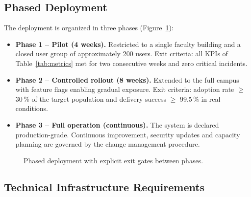 \documentclass[conference,a4paper,10pt]{IEEEtran}
\begin{document}
\subsection{Phased Deployment}

The deployment is organized in three phases (Figure~\ref{fig:phases}):

\begin{itemize}[leftmargin=*]
  \item \textbf{Phase 1 -- Pilot (4 weeks).} Restricted to a single faculty
  building and a closed user group of approximately 200 users. Exit
  criteria: all KPIs of Table~\ref{tab:metrics} met for two consecutive
  weeks and zero critical incidents.
  \item \textbf{Phase 2 -- Controlled rollout (8 weeks).} Extended to the
  full campus with feature flags enabling gradual exposure. Exit
  criteria: adoption rate $\geq$ 30\,\% of the target population and
  delivery success $\geq$ 99.5\,\% in real conditions.
  \item \textbf{Phase 3 -- Full operation (continuous).} The system is
  declared production-grade. Continuous improvement, security updates and
  capacity planning are governed by the change management procedure.
\end{itemize}

\begin{figure}[H]
\centering
{}
\caption{Phased deployment with explicit exit gates between phases.}
\label{fig:phases}
\end{figure}

\subsection{Technical Infrastructure Requirements}
\end{document}
